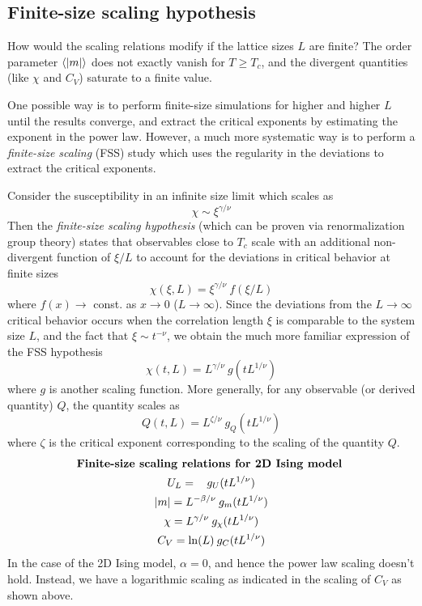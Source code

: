 \documentclass[../thesis_main.tex]{subfiles}
\begin{document}
\subsection{Finite-size scaling hypothesis}
How would the scaling relations modify if the lattice sizes $L$ are finite? The order parameter $\expval{|m|}$ does not exactly vanish for $T \geq T_c$, and the divergent quantities (like $\chi$ and $C_V$) saturate to a finite value.

One possible way is to perform finite-size simulations for higher and higher $L$ until the results converge, and extract the critical exponents by estimating the exponent in the power law. However, a much more systematic way is to perform a \textit{finite-size scaling} (FSS) study which uses the regularity in the deviations to extract the critical exponents.

Consider the susceptibility in an infinite size limit which scales as 
\[
   \chi \sim \xi^{\gamma/\nu}
\]
Then the \textit{finite-size scaling hypothesis} (which can be proven via renormalization group theory) states that observables close to $T_c$ scale with an additional non-divergent function of $\xi/L$ to account for the deviations in critical behavior at finite sizes
\begin{equation}
    \chi(\xi, L) = \xi^{\gamma/\nu} \: f(\xi/L)
\end{equation}
where $f(x) \to $ const. as $x \to 0$ ($L \to \infty$). Since the deviations from the $L \to \infty$ critical behavior occurs when the correlation length $\xi$ is comparable to the system size $L$, and the fact that $\xi \sim t^{-\nu}$, we obtain the much more familiar expression of the FSS hypothesis 
\begin{equation}
    \chi(t, L) = L^{\gamma/\nu} \: g(t L^{1/\nu})
\end{equation}
where $g$ is another scaling function. More generally, for any observable (or derived quantity) $Q$, the quantity scales as
\begin{equation}
    Q(t, L) = L^{\zeta/\nu} \: g_Q(t L^{1/\nu})
\end{equation}
where $\zeta$ is the critical exponent corresponding to the scaling of the quantity $Q$.  
\begin{gather}
    \text{\textbf{Finite-size scaling relations for 2D Ising model} } \\
    U_L =\:\:\: \: g_U(t L^{1/\nu}) \nonumber \\ 
    |m| = L^{-\beta/\nu} \: g_{m}(t L^{1/\nu}) \nonumber \\
    \chi = L^{\gamma/\nu} \: g_\chi(t L^{1/\nu}) \nonumber \\
    C_V = \ln(L) \: g_C(t L^{1/\nu}) \nonumber
\end{gather}
In the case of the 2D Ising model, $\alpha = 0$, and hence the power law scaling doesn't hold. Instead, we have a logarithmic scaling as indicated in the scaling of $C_V$ as shown above.
\end{document}
